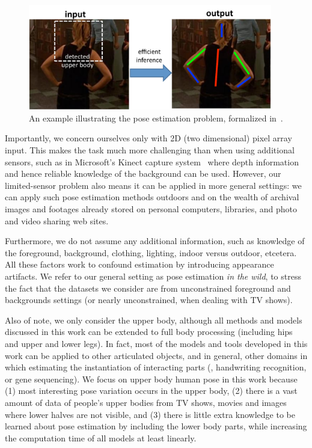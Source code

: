 \begin{figure}[tb]
\begin{center}
\includegraphics[width=0.95\textwidth]{figs/problem-statement.pdf}
\caption[Statement of problem.]{An example illustrating the pose estimation 
problem, formalized in~.}
\label{fig:pose-problem}
\end{center}
\end{figure}

Importantly, we concern ourselves only with 2D (two dimensional) pixel array 
input.  This makes the task much more challenging than when using additional 
sensors, such as in Microsoft's Kinect capture system~\citep{kinect} where 
depth information and hence reliable knowledge of the background can be used.  
However, our limited-sensor problem also means it can be applied in more 
general settings: we can apply such pose estimation methods outdoors and on the 
wealth of archival images and footages already stored on personal computers, 
libraries, and photo and video sharing web sites.  

Furthermore, we do not assume any additional information, such as knowledge of 
the foreground, background, clothing, lighting, indoor versus outdoor, 
etcetera.  All these factors work to confound estimation by introducing 
appearance artifacts.  We refer to our general setting as pose estimation {\em 
in the wild}, to stress the fact that the datasets we consider are from 
unconstrained foreground and backgrounds settings (or nearly unconstrained, 
when dealing with TV shows).

Also of note, we only consider the upper body, although all methods and models 
discussed in this work can be extended to full body processing (\ie including 
hips and upper and lower legs).  In fact, most of the models and tools 
developed in this work can be applied to other articulated objects, and in 
general, other domains in which estimating the instantiation of interacting 
parts (\eg, handwriting recognition, or gene sequencing). We focus on upper 
body human pose in this work because (1) most interesting pose variation occurs 
in the upper body, (2) there is a vast amount of data of people's upper bodies 
from TV shows, movies and images where lower halves are not visible, and (3) 
there is little extra knowledge to be learned about pose estimation by 
including the lower body parts, while increasing the computation time of all 
models at least linearly.  


